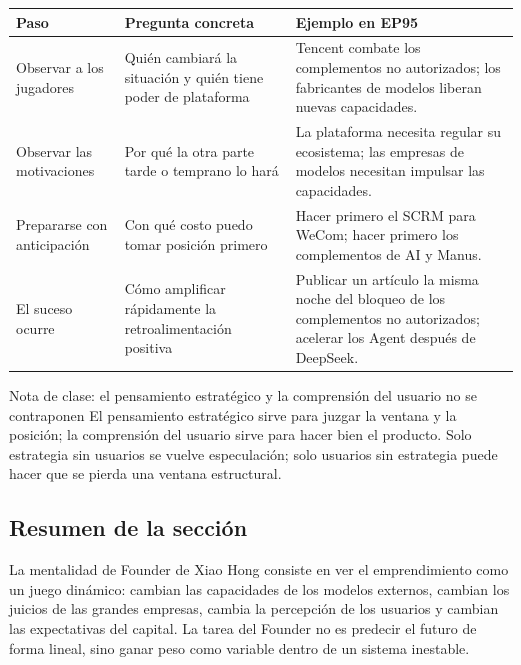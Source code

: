 \noindent\begin{tabularx}{\textwidth}{p{}p{}X}
\toprule
Paso & Pregunta concreta & Ejemplo en EP95 \\
\midrule
Observar a los jugadores & Quién cambiará la situación y quién tiene poder de plataforma & Tencent combate los complementos no autorizados; los fabricantes de modelos liberan nuevas capacidades. \\
Observar las motivaciones & Por qué la otra parte tarde o temprano lo hará & La plataforma necesita regular su ecosistema; las empresas de modelos necesitan impulsar las capacidades. \\
Prepararse con anticipación & Con qué costo puedo tomar posición primero & Hacer primero el SCRM para WeCom; hacer primero los complementos de AI y Manus. \\
El suceso ocurre & Cómo amplificar rápidamente la retroalimentación positiva & Publicar un artículo la misma noche del bloqueo de los complementos no autorizados; acelerar los Agent después de DeepSeek. \\
\bottomrule
\end{tabularx}

\begin{knowledgebox}{Nota de clase: el pensamiento estratégico y la comprensión del usuario no se contraponen}
El pensamiento estratégico sirve para juzgar la ventana y la posición; la comprensión del usuario sirve para hacer bien el producto. Solo estrategia sin usuarios se vuelve especulación; solo usuarios sin estrategia puede hacer que se pierda una ventana estructural.
\end{knowledgebox}

\subsection{Resumen de la sección}

La mentalidad de Founder de Xiao Hong consiste en ver el emprendimiento como un juego dinámico: cambian las capacidades de los modelos externos, cambian los juicios de las grandes empresas, cambia la percepción de los usuarios y cambian las expectativas del capital. La tarea del Founder no es predecir el futuro de forma lineal, sino ganar peso como variable dentro de un sistema inestable.
